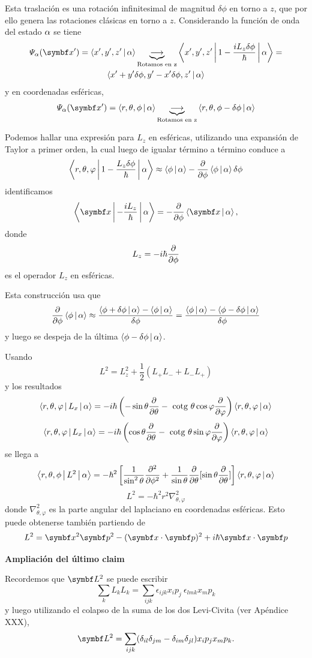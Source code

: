 \documentclass[10pt,oneside]{CBFT_book}
\begin{document}
Esta traslación es una rotación infinitesimal de magnitud $\delta\phi$ en torno a $z$, que por ello
genera las rotaciones clásicas en torno a $z$.
Considerando la función de onda del estado $\a$ se tiene
\begin{multline*}
	\Psi_\alpha(\vb{x}') = \Braket{x',y',z'|\alpha} \underbrace{\longrightarrow}_{\text{Rotamos en z}}
	\Braket{x',y',z'|1-\frac{iL_z\delta\phi}{\hbar}|\alpha} = \\
	\Braket{x'+y'\delta\phi,y'-x'\delta\phi,z'|\alpha}
\end{multline*}
y en coordenadas esféricas,
\[
	\Psi_\alpha(\vb{x}') = \Braket{r,\theta,\phi|\alpha} 
	\underbrace{\longrightarrow}_{\text{Rotamos en z}} \Braket{r,\theta,\phi-\delta\phi|\alpha}
\]

Podemos hallar una expresión para $L_z$ en esféricas, utilizando una expansión de Taylor
a primer orden, la cual luego de igualar término a término conduce a
\[
	\Braket{r,\theta,\varphi|1-\frac{L_z\delta\phi}{\hbar}|\alpha} \approx
	\Braket{\phi|\alpha} -\dpar{}{\phi}\Braket{\phi|\alpha}\delta\phi
\]
identificamos 
\[
	\Braket{\vb{x}|-\frac{iL_z}{\hbar}|\alpha} = -\dpar{}{\phi}\Braket{\vb{x}|\alpha},
\]
donde 
\[
	L_z =  -i\hbar\dpar{}{\phi}
\]
es el operador $L_z$ en esféricas.

Esta construcción usa que 
\[
	\dpar{}{\phi} \Braket{\phi|\alpha} \approx 
	\frac{\Braket{\phi+\delta\phi|\alpha}-\Braket{\phi|\alpha}}{\delta\phi} =
	\frac{\Braket{\phi|\alpha} -\Braket{\phi-\delta\phi|\alpha}}{\delta\phi}
\]
y luego se despeja de la última $\Braket{\phi-\delta\phi|\alpha}$.

Usando 
\[
	L^2 = L_z^2 + \frac{1}{2}\left( L_+L_- + L_-L_+ \right)
\]
y los resultados
\[
	\Braket{r,\theta,\vp|L_x|\a} = 
	- i \hbar \left( -\sin\theta\dpar{}{\theta} - \cotg\theta\cos\vp\dpar{}{\vp} \right) 
	\Braket{r,\theta,\vp|\a}
\]
\[
	\Braket{r,\theta,\vp|L_x|\a} = 
	- i \hbar \left( \cos\theta\dpar{}{\theta} - \cotg\theta\sin\vp\dpar{}{\vp} \right) 
	\Braket{r,\theta,\vp|\a}
\]
se llega a 
\[
	\Braket{r,\theta,\phi|L^2|\alpha} = -\hbar^2\left[ \frac{1}{\sin^2 \theta}\dpar[2]{}{\phi} +
	\frac{1}{\sin \theta} \dpar{}{\theta}[\sin\theta\dpar{}{\theta} ]\right]
	\Braket{r,\theta,\varphi|\alpha}
\]
\[
	L^2 = -\hbar^2 r^2 \nabla^2_{\theta,\varphi}
\]
donde $\nabla^2_{\theta,\varphi}$ es la parte angular del laplaciano en coordenadas esféricas.
Esto puede obtenerse también partiendo de 
\[
	L^2 = \vb{x}^2\vb{p}^2 - (\vb{x}\cdot\vb{p})^2 + i\hbar \vb{x}\cdot\vb{p}
\]

\begin{ejemplo}{\bf Ampliación del último claim}

Recordemos que $\vb{L}^2$ se puede escribir
\[
	\sum_k L_k L_k = \sum_{ijk} \epsilon_{ijk} x_i p_j \: \epsilon_{lmk} x_m p_k
\]
y luego utilizando el colapso de la suma de los dos Levi-Civita (ver Apéndice XXX),
\[
	\vb{L}^2 = \sum_{ijk} ( \delta_{il}\delta_{jm} - \delta_{im}\delta_{jl} ) 
	x_i p_j x_m p_k.
\]
 
\end{ejemplo}
\end{document}
